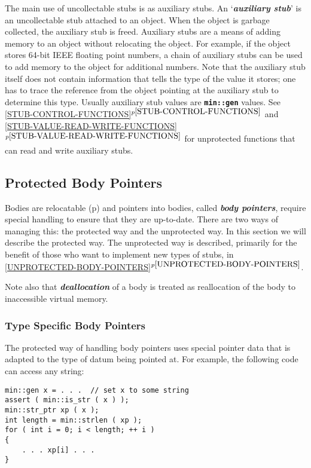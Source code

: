 \documentclass[12pt]{article}
\newcommand{\TT}[1]{{\tt \bfseries #1}}
\newcommand{\key}[1]{{\bf \em #1}\index{#1}}
\newcommand{\skey}[2]{{\bf \em #1#2}\index{#1}}
\newcommand{\ikey}[2]{{\bf \em #1}\index{#2}}
\newcommand{\itemref}[1]{\ref{#1}$^{p\pageref{#1}}$}
\newcommand{\pagref}[1]{p\pageref{#1}}
\newenvironment{indpar}[1][0.3in]%
	{\begin{list}{}%
		     {\setlength{\itemsep}{0in}%
		      \setlength{\topsep}{0in}%
		      \setlength{\parsep}{1ex}%
		      \setlength{\labelwidth}{#1}%
		      \setlength{\leftmargin}{#1}%
		      \addtolength{\leftmargin}{\labelsep}}%
	 \item}%
	{\end{list}}
\begin{document}
The main use of uncollectable stubs is as auxiliary stubs.
An `\key{auxiliary stub}' is an uncollectable stub attached to an object.
When the object is garbage collected, the auxiliary stub is freed.  Auxiliary
stubs are a means of adding memory to an object without relocating the object.
For example, if the object stores 64-bit IEEE floating point numbers,
a chain of auxiliary stubs can be used to add memory to the object
for additional numbers.  Note that the auxiliary stub itself does not
contain information that tells the type of the value it stores;
one has to trace the reference from the object pointing at the
auxiliary stub to determine this type.  Usually auxiliary stub
values are \TT{min::gen} values.
See \itemref{STUB-CONTROL-FUNCTIONS} and
\itemref{STUB-VALUE-READ-WRITE-FUNCTIONS}
for unprotected functions that can read and write auxiliary stubs.

\subsection{Protected Body Pointers}
\label{PROTECTED-BODY-POINTERS}

Bodies are relocatable
(\pagref{RELOCATABLE-BODY}) and pointers into bodies,
called \skey{body pointer}s,
require special handling to
ensure that they are up-to-date.  There are two ways of managing
this: the protected way and the unprotected way.
In this section we will describe the protected way.
The unprotected way is described, primarily for the benefit of those
who want to implement new types of stubs,
in \itemref{UNPROTECTED-BODY-POINTERS}.

Note also that \ikey{deallocation}{deallocate} of a body is treated as
reallocation of the body to inaccessible virtual memory.

\subsubsection{Type Specific Body Pointers}
\label{TYPE-SPECIFIC-BODY-POINTERS}

The protected way of handling body pointers
uses special pointer data that is adapted to
the type of datum being pointed at.  For example, the following
code can access any string:
\begin{indpar}\begin{verbatim}
min::gen x = . . .  // set x to some string
assert ( min::is_str ( x ) );
min::str_ptr xp ( x );
int length = min::strlen ( xp );
for ( int i = 0; i < length; ++ i )
{
    . . . xp[i] . . .
}
\end{verbatim}\end{indpar}
\end{document}
